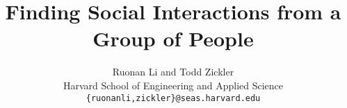 \documentclass[10pt,twocolumn,letterpaper]{article}
\begin{document}
\title{Finding Social Interactions from a Group of People}
\author{ Ruonan Li and Todd Zickler\\
Harvard School of Engineering and Applied Science\\
{\tt\small \{ruonanli,zickler\}@seas.harvard.edu}
}

\maketitle












{\footnotesize

}
\end{document}
